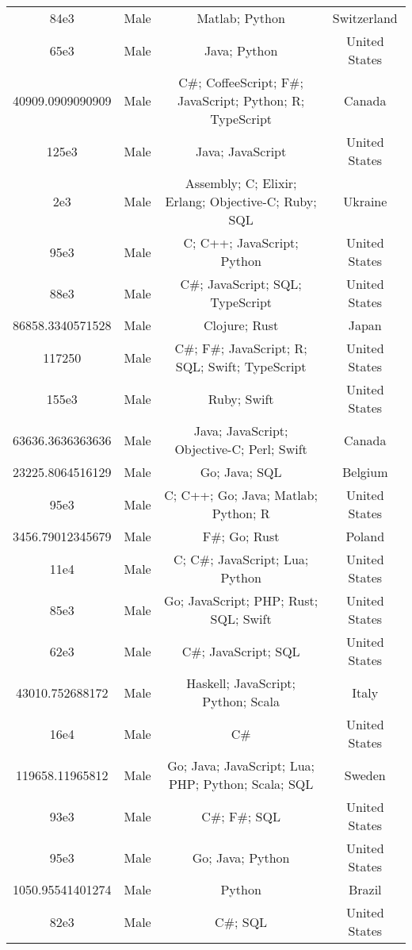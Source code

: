 \begin{center}
\begin{tabular}{ |c|c|c|c| }
84e3  &  Male  &  Matlab; Python  &  Switzerland  \\ 
65e3  &  Male  &  Java; Python  &  United States  \\ 
40909.0909090909  &  Male  &  C\#; CoffeeScript; F\#; JavaScript; Python; R; TypeScript  &  Canada  \\ 
125e3  &  Male  &  Java; JavaScript  &  United States  \\ 
2e3  &  Male  &  Assembly; C; Elixir; Erlang; Objective-C; Ruby; SQL  &  Ukraine  \\ 
95e3  &  Male  &  C; C++; JavaScript; Python  &  United States  \\ 
88e3  &  Male  &  C\#; JavaScript; SQL; TypeScript  &  United States  \\ 
86858.3340571528  &  Male  &  Clojure; Rust  &  Japan  \\ 
117250  &  Male  &  C\#; F\#; JavaScript; R; SQL; Swift; TypeScript  &  United States  \\ 
155e3  &  Male  &  Ruby; Swift  &  United States  \\ 
63636.3636363636  &  Male  &  Java; JavaScript; Objective-C; Perl; Swift  &  Canada  \\ 
23225.8064516129  &  Male  &  Go; Java; SQL  &  Belgium  \\ 
95e3  &  Male  &  C; C++; Go; Java; Matlab; Python; R  &  United States  \\ 
3456.79012345679  &  Male  &  F\#; Go; Rust  &  Poland  \\ 
11e4  &  Male  &  C; C\#; JavaScript; Lua; Python  &  United States  \\ 
85e3  &  Male  &  Go; JavaScript; PHP; Rust; SQL; Swift  &  United States  \\ 
62e3  &  Male  &  C\#; JavaScript; SQL  &  United States  \\ 
43010.752688172  &  Male  &  Haskell; JavaScript; Python; Scala  &  Italy  \\ 
16e4  &  Male  &  C\#  &  United States  \\ 
119658.11965812  &  Male  &  Go; Java; JavaScript; Lua; PHP; Python; Scala; SQL  &  Sweden  \\ 
93e3  &  Male  &  C\#; F\#; SQL  &  United States  \\ 
95e3  &  Male  &  Go; Java; Python  &  United States  \\ 
1050.95541401274  &  Male  &  Python  &  Brazil  \\ 
82e3  &  Male  &  C\#; SQL  &  United States  \\ 

\end{tabular}
\end{center}
